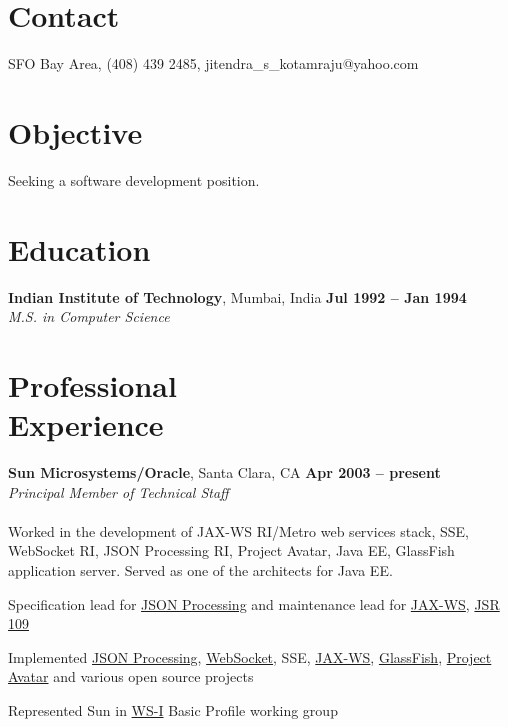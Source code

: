 \documentclass[margin,line]{resume}
\begin{document}
\begin{resume}

\section{\mysidestyle Contact}

SFO Bay Area, (408) 439 2485, jitendra\_s\_kotamraju@yahoo.com


\section{\mysidestyle Objective}

Seeking a software development position.

\section{\mysidestyle Education}

\textbf{Indian Institute of Technology}, Mumbai, India \hfill \textbf{Jul 1992 -- Jan 1994}\\
\textsl{M.S. in Computer Science}


\section{\mysidestyle Professional\\Experience}

    \textbf{Sun Microsystems/Oracle}, Santa Clara, CA \hfill \textbf{Apr 2003 -- present}\\ 
    \textsl{Principal Member of Technical Staff}\\\\
Worked in the development of JAX-WS RI/Metro web services stack, SSE, WebSocket RI, JSON Processing RI, Project Avatar, Java EE, GlassFish application server. Served as one of the architects for Java EE.
    \begin{list2}
    \item Specification lead for \href{https://json-processing-spec.java.net}{JSON Processing} and maintenance lead for \href{http://jcp.org/en/jsr/detail?id=224}{JAX-WS}, \href{http://jcp.org/en/jsr/detail?id=109}{JSR 109}
    \item Implemented \href{https://jsonp.java.net}{JSON Processing}, \href{https://tyrus.java.net}{WebSocket}, SSE, \href{https://jax-ws.java.net}{JAX-WS}, \href{https://glassfish.java.net}{GlassFish}, \href{https://avatar.java.net}{Project Avatar} and various open source projects
    \item Represented Sun in \href{http://www.ws-i.org}{WS-I} Basic Profile working group
    \end{list2}\vspace{-1.5mm}



\end{resume}
\end{document}

